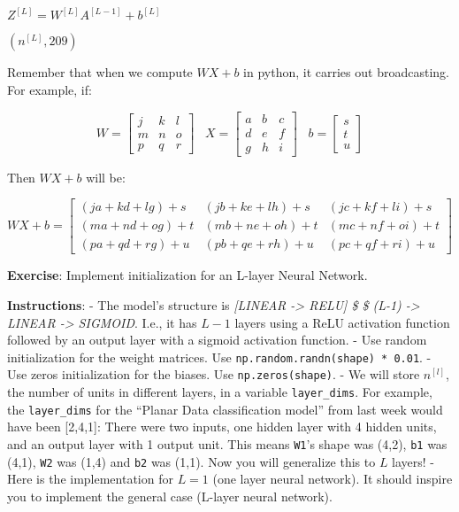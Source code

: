 \documentclass[11pt]{article}
\begin{document}
$Z^{[L]} =  W^{[L]} A^{[L-1]} + b^{[L]}$

$(n^{[L]}, 209)$

Remember that when we compute $W X + b$ in python, it carries out
broadcasting. For example, if:

\[ W = \begin{bmatrix}
    j  & k  & l\\
    m  & n & o \\
    p  & q & r 
\end{bmatrix}\;\;\; X = \begin{bmatrix}
    a  & b  & c\\
    d  & e & f \\
    g  & h & i 
\end{bmatrix} \;\;\; b =\begin{bmatrix}
    s  \\
    t  \\
    u
\end{bmatrix}\tag{2}\]

Then $WX + b$ will be:

\[ WX + b = \begin{bmatrix}
    (ja + kd + lg) + s  & (jb + ke + lh) + s  & (jc + kf + li)+ s\\
    (ma + nd + og) + t & (mb + ne + oh) + t & (mc + nf + oi) + t\\
    (pa + qd + rg) + u & (pb + qe + rh) + u & (pc + qf + ri)+ u
\end{bmatrix}\tag{3}  \]

    \textbf{Exercise}: Implement initialization for an L-layer Neural
Network.

\textbf{Instructions}: - The model's structure is \emph{{[}LINEAR
-\textgreater{} RELU{]} \$ \times\$ (L-1) -\textgreater{} LINEAR
-\textgreater{} SIGMOID}. I.e., it has $L-1$ layers using a ReLU
activation function followed by an output layer with a sigmoid
activation function. - Use random initialization for the weight
matrices. Use \texttt{np.random.randn(shape) * 0.01}. - Use zeros
initialization for the biases. Use \texttt{np.zeros(shape)}. - We will
store $n^{[l]}$, the number of units in different layers, in a variable
\texttt{layer\_dims}. For example, the \texttt{layer\_dims} for the
``Planar Data classification model'' from last week would have been
{[}2,4,1{]}: There were two inputs, one hidden layer with 4 hidden
units, and an output layer with 1 output unit. This means \texttt{W1}'s
shape was (4,2), \texttt{b1} was (4,1), \texttt{W2} was (1,4) and
\texttt{b2} was (1,1). Now you will generalize this to $L$ layers! -
Here is the implementation for $L=1$ (one layer neural network). It
should inspire you to implement the general case (L-layer neural
network).
\end{document}
